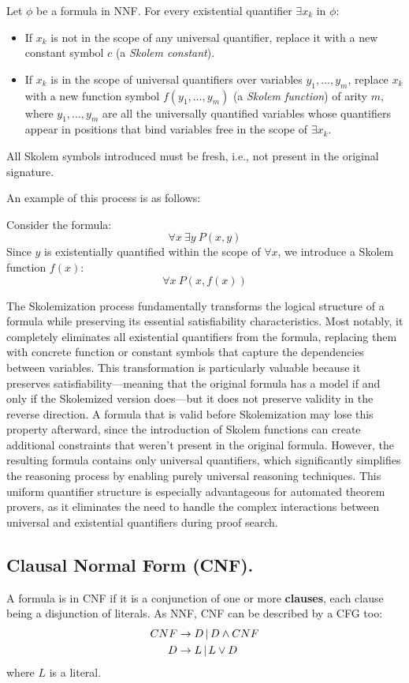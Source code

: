 Let \(\phi\) be a formula in NNF\@. For every existential quantifier \(\exists x_k\) in \(\phi\):
\begin{itemize}
  \item If \(x_k\) is not in the scope of any universal quantifier, replace it with a new constant symbol \(c\) (a \emph{Skolem constant}).
  \item If \(x_k\) is in the scope of universal quantifiers over variables \(y_1, \dots, y_m\), replace \(x_k\) with a new function symbol \(f(y_1, \dots, y_m)\) (a \emph{Skolem function}) of arity \(m\), where \(y_1, \dots, y_m\) are all the universally quantified variables whose quantifiers appear in positions that bind variables free in the scope of \(\exists x_k\).
\end{itemize}
All Skolem symbols introduced must be fresh, i.e., not present in the original signature.


An example of this process is as follows:

Consider the formula:
\[
\forall x \: \exists y \: P(x, y)
\]
Since \(y\) is existentially quantified within the scope of \(\forall x\), we introduce a Skolem function \(f(x)\):
\[
\forall x \: P(x, f(x))
\]

The Skolemization process fundamentally transforms the logical structure of a formula while preserving its essential satisfiability characteristics.
Most notably, it completely eliminates all existential quantifiers from the formula, replacing them with concrete function or constant symbols that capture the dependencies between variables.
This transformation is particularly valuable because it preserves satisfiability—meaning that the original formula has a model if and only if the Skolemized version does—but it does not preserve validity in the reverse direction.
A formula that is valid before Skolemization may lose this property afterward, since the introduction of Skolem functions can create additional constraints that weren't present in the original formula.
However, the resulting formula contains only universal quantifiers, which significantly simplifies the reasoning process by enabling purely universal reasoning techniques. 
This uniform quantifier structure is especially advantageous for automated theorem provers, as it eliminates the need to handle the complex interactions between universal and existential quantifiers during proof search.

\subsection{Clausal Normal Form (CNF).}
A formula is in CNF if it is a conjunction of one or more \textbf{clauses}, each clause being a disjunction of literals.  
As NNF, CNF can be described by a CFG too:
\begin{equation}
  \begin{aligned}
    CNF &\to D  \, | \,  D \land CNF \\
      D &\to L  \, | \,  L \lor D
  \end{aligned}
\end{equation}
where \(L\) is a literal.

